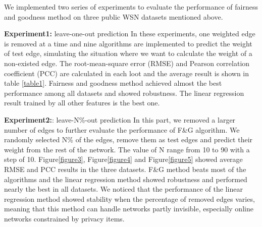 
We implemented two series of experiments to evaluate the 
performance of fairness and goodness method on three public 
WSN datasets mentioned above. 

\textbf{Experiment1:} leave-one-out prediction
In these experiments, one weighted edge is removed at a time 
and nine algorithms are implemented to predict the weight of 
test edge, simulating the situation where we want to calculate 
the weight of a non-existed edge. The root-mean-square error 
(RMSE) and Pearson correlation coefficient (PCC) are calculated 
in each loot and the average result is shown in table \ref{table1}. 
Fairness and goodness method achieved almost the best 
performance among all datasets and showed robustness. 
The linear regression result trained by all other features 
is the best one. 

\textbf{Experiment2:}: leave-N\%-out prediction
In this part, we removed a larger number of edges to further 
evaluate the performance of F\&G algorithm. We randomly selected 
N\% of the edges, remove them as test edges and predict their 
weight from the rest of the network. The value of N range from 10 
to 90 with a step of 10. Figure\ref{figure3}, Figure\ref{figure4} and 
Figure\ref{figure5} showed average RMSE and PCC results in 
the three datasets. F\&G method beats most of the algorithms 
and the linear regression method showed robustness and performed 
nearly the best in all datasets. We noticed that the performance of
 the linear regression method showed stability when the percentage 
 of removed edges varies, meaning that this method can handle 
 networks partly invisible, especially online networks 
 constrained by privacy items. 


